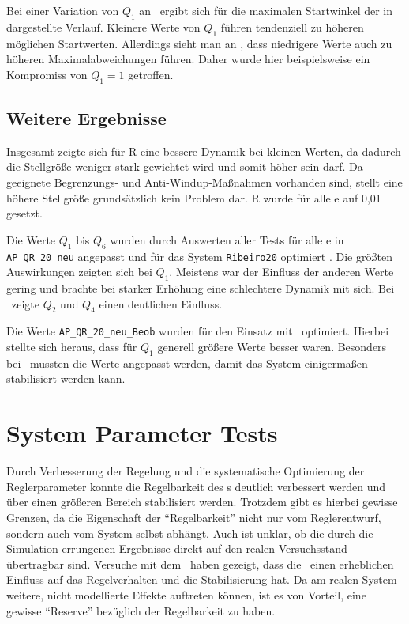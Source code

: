 Bei einer Variation von $Q_1$ an \apv\ ergibt sich für die maximalen Startwinkel der in  dargestellte Verlauf.
Kleinere Werte von $Q_1$ führen tendenziell zu höheren möglichen Startwerten.
Allerdings sieht man an , dass niedrigere Werte auch zu höheren Maximalabweichungen führen.
Daher wurde hier beispielsweise ein Kompromiss von $Q_1=1$ getroffen.


\subsection{Weitere Ergebnisse}

Insgesamt zeigte sich für R eine bessere Dynamik bei kleinen Werten, da dadurch die Stellgröße weniger stark gewichtet wird und somit höher sein darf.
Da geeignete Begrenzungs- und Anti-Windup-Maßnahmen vorhanden sind, stellt eine höhere Stellgröße grundsätzlich kein Problem dar.
R wurde für alle \ap e auf 0,01 gesetzt.

Die Werte $Q_1$ bis $Q_6$ wurden durch Auswerten aller Tests für alle \ap e in \texttt{AP\_QR\_20\_neu} angepasst und für das System \texttt{Ribeiro20} optimiert .
Die größten Auswirkungen zeigten sich bei $Q_1$. 
Meistens war der Einfluss der anderen Werte gering und brachte bei starker Erhöhung eine schlechtere Dynamik mit sich.
Bei \apv\ zeigte $Q_2$ und $Q_4$ einen deutlichen Einfluss.

Die Werte \texttt{AP\_QR\_20\_neu\_Beob} wurden für den Einsatz mit \beob\ optimiert.
Hierbei stellte sich heraus, dass für $Q_1$ generell größere Werte besser waren.
Besonders bei \apv\ mussten die Werte angepasst werden, damit das System einigermaßen stabilisiert werden kann.




\section{System Parameter Tests}\label{sec:x0sys}

Durch Verbesserung der Regelung und die systematische Optimierung der Reglerparameter konnte die Regelbarkeit des \dpd s deutlich verbessert werden und über einen größeren Bereich stabilisiert werden.
Trotzdem gibt es hierbei gewisse Grenzen, da die Eigenschaft der "`Regelbarkeit"' nicht nur vom Reglerentwurf, sondern auch vom System selbst abhängt.
Auch ist unklar, ob die durch die Simulation errungenen Ergebnisse direkt auf den realen Versuchsstand übertragbar sind.
Versuche mit dem \beob\ haben gezeigt, dass die \ze\ einen erheblichen Einfluss auf das Regelverhalten und die Stabilisierung hat.
Da am realen System weitere, nicht modellierte Effekte auftreten können, ist es von Vorteil, eine gewisse "`Reserve"' bezüglich der Regelbarkeit zu haben.


